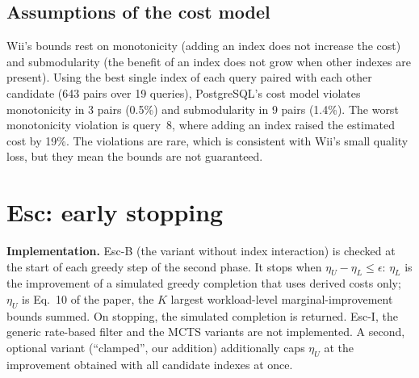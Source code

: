 \documentclass[11pt,a4paper]{article}
\begin{document}
\subsection{Assumptions of the cost model}
Wii's bounds rest on monotonicity (adding an index does not increase the cost) and submodularity (the benefit of an index does not grow when other indexes are present). Using the best single index of each query paired with each other candidate (643 pairs over 19 queries), PostgreSQL's cost model violates monotonicity in 3 pairs (0.5\%) and submodularity in 9 pairs (1.4\%). The worst monotonicity violation is query~8, where adding an index raised the estimated cost by 19\%. The violations are rare, which is consistent with Wii's small quality loss, but they mean the bounds are not guaranteed.

\section{Esc: early stopping}
\textbf{Implementation.} Esc-B (the variant without index interaction) is checked at the start of each greedy step of the second phase. It stops when $\eta_U-\eta_L\le\epsilon$: $\eta_L$ is the improvement of a simulated greedy completion that uses derived costs only; $\eta_U$ is Eq.~10 of the paper, the $K$ largest workload-level marginal-improvement bounds summed. On stopping, the simulated completion is returned. Esc-I, the generic rate-based filter and the MCTS variants are not implemented. A second, optional variant (``clamped'', our addition) additionally caps $\eta_U$ at the improvement obtained with all candidate indexes at once.
\end{document}
